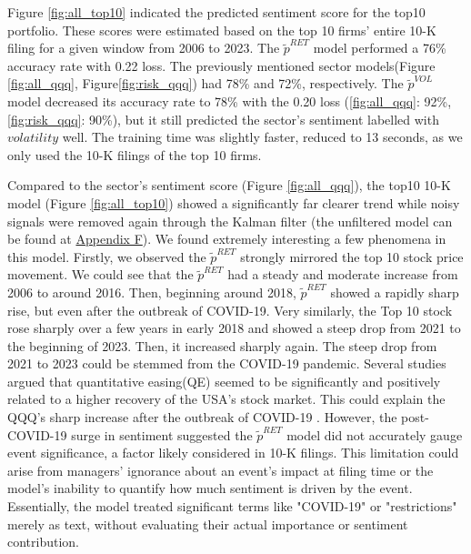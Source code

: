 \documentclass[logo,bsc,singlespacing,parskip]{infthesis}
\begin{document}

Figure \ref{fig:all_top10} indicated the predicted sentiment score for the top10 portfolio. These scores were estimated based on the top 10 firms’ entire 10-K filing for a given window from 2006 to 2023.  The $\tilde{p}^{RET}$ model performed a 76\% accuracy rate with 0.22 loss. The previously mentioned sector models(Figure \ref{fig:all_qqq}, Figure\ref{fig:risk_qqq}) had 78\% and 72\%, respectively. The $\tilde{p}^{VOL}$ model decreased its accuracy rate to 78\% with the 0.20 loss (\ref{fig:all_qqq}: 92\%, \ref{fig:risk_qqq}: 90\%), but it still predicted the sector’s sentiment labelled with $volatility$ well. The training time was slightly faster, reduced to 13 seconds, as we only used the 10-K filings of the top 10 firms. 

Compared to the sector’s sentiment score (Figure \ref{fig:all_qqq}), the top10 10-K model (Figure \ref{fig:all_top10}) showed a significantly far clearer trend while noisy signals were removed again through the Kalman filter (the unfiltered model can be found at \hyperref[appendix_all_top10]{Appendix F}). We found extremely interesting a few phenomena in this model. Firstly, we observed the $\tilde{p}^{RET}$ strongly mirrored the top 10 stock price movement. We could see that the $\tilde{p}^{RET}$ had a steady and moderate increase from 2006 to around 2016. Then, beginning around 2018, $\tilde{p}^{RET}$ showed a rapidly sharp rise, but even after the outbreak of COVID-19. Very similarly, the Top 10 stock rose sharply over a few years in early 2018 and showed a steep drop from 2021 to the beginning of 2023. Then, it increased sharply again. The steep drop from 2021 to 2023 could be stemmed from the COVID-19 pandemic. Several studies argued that quantitative easing(QE) seemed to be significantly and positively related to a higher recovery of the USA’s stock market. This could explain the QQQ’s sharp increase after the outbreak of COVID-19 \cite{Gagnon2010, Chen2011, Curdia2013, Gilchrist2013, Wang2019, Sunder2021, Seven2021, Gourinchas2021}. However, the post-COVID-19 surge in sentiment suggested the $\tilde{p}^{RET}$ model did not accurately gauge event significance, a factor likely considered in 10-K filings. This limitation could arise from managers' ignorance about an event's impact at filing time or the model's inability to quantify how much sentiment is driven by the event. Essentially, the model treated significant terms like "COVID-19" or "restrictions" merely as text, without evaluating their actual importance or sentiment contribution.
  
\end{document}
